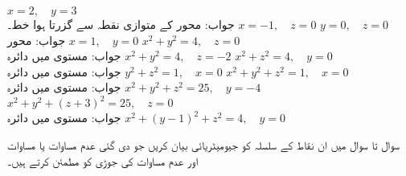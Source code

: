 $x=2,\quad y=3$\\
جواب:\quad
محور  کے متوازی نقطہ  سے گزرتا ہوا خط۔
$x=-1,\quad z=0$
$y=0,\quad z=0$\\
جواب:\quad
محور 
$x=1,\quad y=0$
$x^2+y^2=4,\quad z=0$\\
جواب:\quad
مستوی  میں دائرہ 
$x^2+y^2=4,\quad z=-2$
$x^2+z^2=4,\quad y=0$\\
جواب:\quad
مستوی  میں دائرہ 
$y^2+z^2=1,\quad x=0$
$x^2+y^2+z^2=1,\quad x=0$\\
جواب:\quad
مستوی  میں دائرہ 
$x^2+y^2+z^2=25,\quad y=-4$
$x^2+y^2+(z+3)^2=25,\quad z=0$\\
جواب:\quad
مستوی  میں دائرہ 
$x^2+(y-1)^2+z^2=4,\quad y=0$

سوال  تا سوال  میں ان نقاط کے سلسلہ کو جیومیٹریائی بیان کریں جو دی گئی عدم مساوات یا مساوات اور عدم مساوات کی جوڑی کو مطمئن کرتے ہیں۔   

